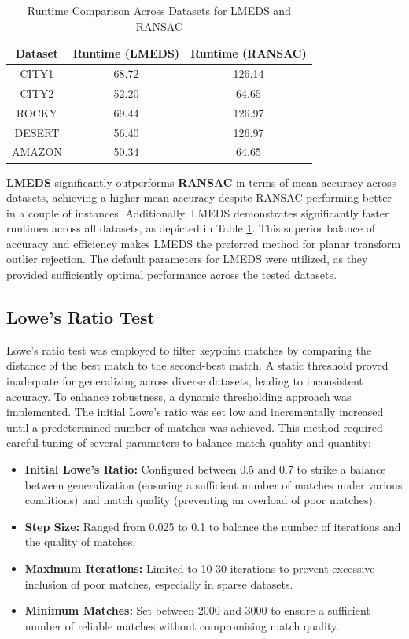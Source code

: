 \begin{table}[H]
    \centering
    \caption{Runtime Comparison Across Datasets for LMEDS and RANSAC}
    \label{tab:runtime_comparison_opt}
    \begin{tabular}{|c|c|c|}
    \hline
    \textbf{Dataset} & \textbf{Runtime (LMEDS)} & \textbf{Runtime (RANSAC)} \\ \hline
    CITY1   & 68.72 & 126.14 \\ \hline
    CITY2   & 52.20 & 64.65  \\ \hline
    ROCKY   & 69.44 & 126.97 \\ \hline
    DESERT  & 56.40 & 126.97 \\ \hline
    AMAZON  & 50.34 & 64.65  \\ \hline
    \end{tabular}
\end{table}

\textbf{LMEDS} significantly outperforms \textbf{RANSAC} in terms of mean accuracy across datasets, achieving a higher mean accuracy despite RANSAC performing better in a couple of instances. Additionally, LMEDS demonstrates significantly faster runtimes across all datasets, as depicted in Table \ref{tab:runtime_comparison_opt}. This superior balance of accuracy and efficiency makes LMEDS the preferred method for planar transform outlier rejection. The default parameters for LMEDS were utilized, as they provided sufficiently optimal performance across the tested datasets.

\subsection{Lowe's Ratio Test}

Lowe's ratio test was employed to filter keypoint matches by comparing the distance of the best match to the second-best match. A static threshold proved inadequate for generalizing across diverse datasets, leading to inconsistent accuracy. To enhance robustness, a dynamic thresholding approach was implemented. The initial Lowe's ratio was set low and incrementally increased until a predetermined number of matches was achieved. This method required careful tuning of several parameters to balance match quality and quantity:

\begin{itemize}
    \item \textbf{Initial Lowe's Ratio:} Configured between 0.5 and 0.7 to strike a balance between generalization (ensuring a sufficient number of matches under various conditions) and match quality (preventing an overload of poor matches).
    \item \textbf{Step Size:} Ranged from 0.025 to 0.1 to balance the number of iterations and the quality of matches.
    \item \textbf{Maximum Iterations:} Limited to 10-30 iterations to prevent excessive inclusion of poor matches, especially in sparse datasets.
    \item \textbf{Minimum Matches:} Set between 2000 and 3000 to ensure a sufficient number of reliable matches without compromising match quality.
\end{itemize}

